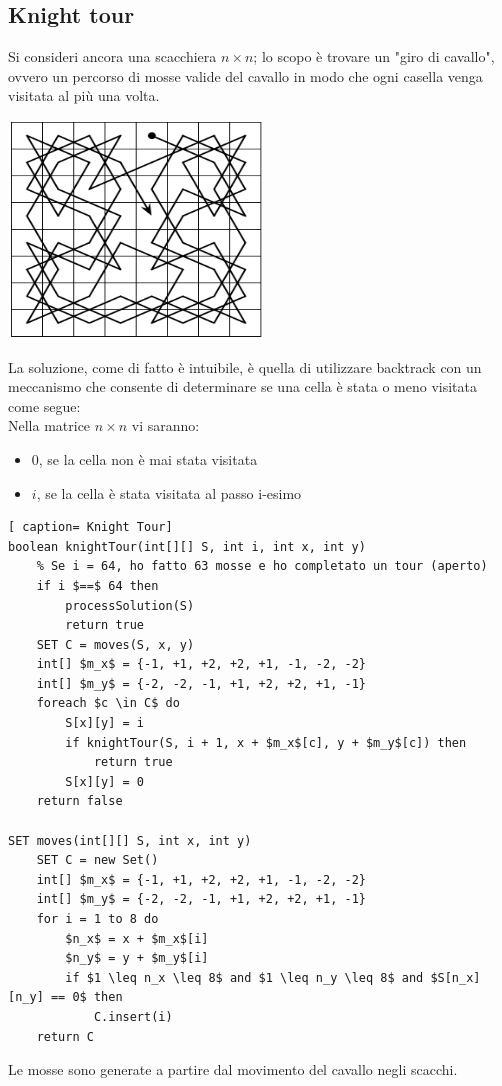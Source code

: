 \documentclass[../cheatSheetAlgoritmi.tex]{subfiles}
\begin{document}
\subsection{Knight tour}
Si consideri ancora una scacchiera $n \times n$; lo scopo è trovare un "giro di cavallo", ovvero un percorso di mosse valide del cavallo in modo che ogni casella venga visitata al più una volta.
\begin{center}
	\includegraphics{../img/backtracking_knight_tour}
\end{center}
La soluzione, come di fatto è intuibile, è quella di utilizzare backtrack con un meccanismo che consente di determinare se una cella è stata o meno visitata come segue: \\
Nella matrice $n \times n$ vi saranno:
\begin{itemize}
	\item 0, se la cella non è mai stata visitata
	\item $i$, se la cella è stata visitata al passo i-esimo
\end{itemize}
 \begin{lstlisting}[ caption= Knight Tour]
boolean knightTour(int[][] S, int i, int x, int y)
	% Se i = 64, ho fatto 63 mosse e ho completato un tour (aperto)
	if i $==$ 64 then
		processSolution(S)
		return true
	SET C = moves(S, x, y)
	int[] $m_x$ = {-1, +1, +2, +2, +1, -1, -2, -2}
	int[] $m_y$ = {-2, -2, -1, +1, +2, +2, +1, -1}
	foreach $c \in C$ do
		S[x][y] = i
		if knightTour(S, i + 1, x + $m_x$[c], y + $m_y$[c]) then
			return true
		S[x][y] = 0
	return false
	
SET moves(int[][] S, int x, int y)
	SET C = new Set()
	int[] $m_x$ = {-1, +1, +2, +2, +1, -1, -2, -2}
	int[] $m_y$ = {-2, -2, -1, +1, +2, +2, +1, -1}
	for i = 1 to 8 do
		$n_x$ = x + $m_x$[i]
		$n_y$ = y + $m_y$[i]
		if $1 \leq n_x \leq 8$ and $1 \leq n_y \leq 8$ and $S[n_x][n_y] == 0$ then
			C.insert(i)
	return C
\end{lstlisting}
Le mosse sono generate a partire dal movimento del cavallo negli scacchi. \\
\end{document}
